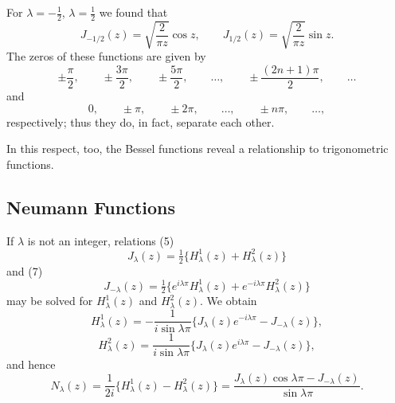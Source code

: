 For $\lambda=-\tfrac12$, $\lambda=\tfrac12$ we found that
\[
J_{-1/2}(z)=\sqrt{\frac2{\pi z}}\cos z,\qquad
J_{1/2}(z)=\sqrt{\frac2{\pi z}}\sin z.
\]
The zeros of these functions are given by
\[
\pm\frac\pi2,\qquad \pm\frac{3\pi}2,\qquad \pm\frac{5\pi}2,\qquad\ldots,\qquad
\pm\frac{(2n+1)\pi}{2},\qquad\ldots
\]
and
\[
0,\qquad\pm\pi,\qquad\pm2\pi,\qquad\ldots,\qquad\pm n\pi,\qquad\ldots,
\]
respectively; thus they do, in fact, separate each other.

In this respect, too, the Bessel functions reveal a relationship to trigonometric functions.

\subsection{Neumann Functions}
If $\lambda$ is not an integer, relations (5)
\[
J_\lambda(z)=\tfrac12\{H_\lambda^1(z)+H_\lambda^2(z)\}
\]
and (7)
\[
J_{-\lambda}(z)=\tfrac12\{e^{i\lambda\pi}H_\lambda^1(z)+e^{-i\lambda\pi}H_\lambda^2(z)\}
\]
may be solved for $H_\lambda^1(z)$ and $H_\lambda^2(z)$. We obtain
\begin{equation}\tag{38}
H_\lambda^1(z)=-\frac1{i\sin\lambda\pi}\{J_\lambda(z)e^{-i\lambda\pi}-J_{-\lambda}(z)\},
\end{equation}
\begin{equation}\tag{38'}
H_\lambda^2(z)=\frac1{i\sin\lambda\pi}\{J_\lambda(z)e^{i\lambda\pi}-J_{-\lambda}(z)\},
\end{equation}
and hence
\begin{equation}\tag{39}
N_\lambda(z)=\frac1{2i}\{H_\lambda^1(z)-H_\lambda^2(z)\}
=\frac{J_\lambda(z)\cos\lambda\pi-J_{-\lambda}(z)}{\sin\lambda\pi}.
\end{equation}

